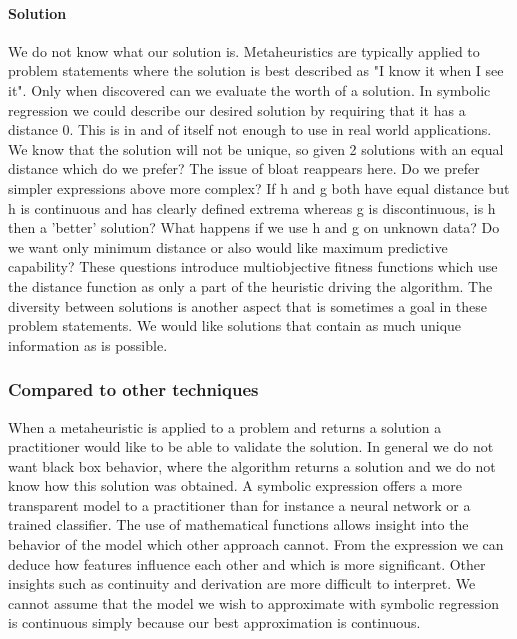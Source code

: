\paragraph{Solution}
We do not know what our solution is. Metaheuristics are typically applied to problem statements where the solution is best described as "I know it when I see it". Only when discovered can we evaluate the worth of a solution. In symbolic regression we could describe our desired solution by requiring that it has a distance 0. This is in and of itself not enough to use in real world applications. We know that the solution will not be unique, so given 2 solutions with an equal distance which do we prefer? The issue of bloat reappears here. Do we prefer simpler expressions above more complex? If h and g both have equal distance but h is continuous and has clearly defined extrema whereas g is discontinuous, is h then a 'better' solution? What happens if we use h and g on unknown data? Do we want only minimum distance or also would like maximum predictive capability? These questions introduce multiobjective fitness functions which use the distance function as only a part of the heuristic driving the algorithm. The diversity between solutions is another aspect that is sometimes a goal in these problem statements. We would like solutions that contain as much unique information as is possible. 


\subsubsection{Compared to other techniques}
When a metaheuristic is applied to a problem and returns a solution a practitioner would like to be able to validate the solution. In general we do not want black box behavior, where the algorithm returns a solution and we do not know how this solution was obtained. A symbolic expression offers a more transparent model to a practitioner than for instance a neural network or a trained classifier. The use of mathematical functions allows insight into the behavior of the model which other approach cannot. From the expression we can deduce how features influence each other and which is more significant. Other insights such as continuity and derivation are more difficult to interpret. We cannot assume that the model we wish to approximate with symbolic regression is continuous simply because our best approximation is continuous.

